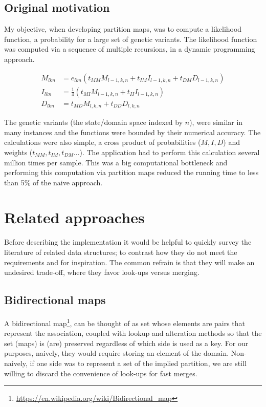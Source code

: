 \documentclass{article}
\begin{document}
\subsection{Original motivation}

My objective,
when developing partition maps,
was to compute a likelihood function,
a probability for a large set of genetic variants.
The likelihood function was computed via a sequence of multiple recursions,
in a dynamic programming approach.

\begin{align}
  M_{lkn} &= e_{lkn}(t_{MM}M_{l-1,k,n} + t_{IM}I_{l-1,k,n} + t_{DM}D_{l-1,k,n})
  \nonumber \\
  I_{lkn} &= \frac{1}{4}(t_{MI}M_{l-1,k,n} + t_{II}I_{l-1,k,n}) \nonumber \\
  D_{lkn} &= t_{MD}M_{l,k,n} + t_{DD}D_{l,k,n} \nonumber
\end{align}

The genetic variants (the state/domain space indexed by $n$),
were similar in many instances and the functions were
bounded by their numerical accuracy.
The calculations were also simple,
a cross product of probabilities ($M, I, D$) and weights ($t_{MM}, t_{IM}, t_{DM} \ldots$).
The application had to perform this calculation several million times
per sample.
This was a big computational bottleneck
and performing this computation via partition maps
reduced the running time to less than 5\% of the naive approach.


\section{Related approaches}

Before describing the implementation it would be helpful to quickly survey the
literature of related data structures;
to contrast how they do not meet the requirements and
for inspiration.
The common refrain is that they will make an undesired trade-off,
where they favor look-ups versus merging.

\subsection{Bidirectional maps}

A bidirectional map\footnote{\url{https://en.wikipedia.org/wiki/Bidirectional_map}},
can be thought of as set whose elements are pairs that represent the association,
coupled with lookup and alteration methods so that the set (maps) is (are) preserved
regardless of which side is used as a key.
For our purposes, naively, they would require storing an element of the domain.
Non-naively, if one side was to represent a set of the implied partition,
we are still willing to discard the convenience of look-ups for fast merges.
\end{document}
